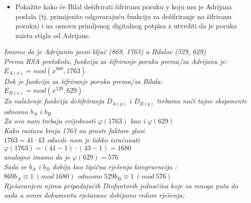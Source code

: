 \documentclass[12pt]{article}
\begin{document}
\begin{enumerate}
\begin{itemize}
\item Pokažite kako će Bilal dešifrirati šifriranu poruku y koju mu je Adrijana poslala (tj. primijenite odgovarajuću funkciju za dešifriranje na šifriranu poruku) i na osnovu primljenog digitalnog potpisa z utvrditi da je poruka zaista stigla od Adrijane.
\end {itemize}
\vspace{0.75cm}
        \begin{center}
        \textit{Imamo da je Adrijanin javni ključ (869, 1763) a Bilalov (529, 629)\\ Prema RSA protokolu, funkcija za šifriranje poruka prema/za Adrijanu je:\\ \vspace{0.15cm}
        $E_{A(x)} = mod(x^{869}, 1763)$\\ \vspace{0.15cm} Dok je funkcija za šifriranje poruka prema/za Bilala:\\ \vspace{0.15cm} $E_{B(x)} = mod(x^{529}, 629)$\\ \vspace{0.15cm} Za nalaženje funkcija dešifriranja $D_{A(y)}$ i $D_{B(y)}$ trebamo naći tajne eksponente \\odnosno $b_A$ i $b_B$\\ Za ovo nam trebaju vrijednosti $\varphi(1763)$ kao i $\varphi(629)$ \\ Kako rastava broja 1763 na proste faktore glasi\\ $1763 = 41 \cdot 43$ odavde nam je lahko izračunati $\varphi(1763) = (41 - 1)\cdot(43 - 1) = 1680$\\ analogno imamo da je $\varphi(629) = 576$\\ \vspace{0.15cm} Sada se $b_A$ i $b_B$ dobiju kao tipična rješenja kongruencija :\\ \vspace{0.15cm}
        $869b_A \equiv 1 \ (mod\ 1680)$ odnosno $529b_B \equiv 1 \ (mod\ 576)$}\\
         \vspace*{0.5cm}
         \textit{Rješavanjem njima pripadajućih Diofantovih jednačina koje su mnogo puta do sada u ovom dokumentu rješavane dobijamo redom rješenja:\\ \vspace{0.15cm}
}
\end{center}
\end{enumerate}
\end{document}
